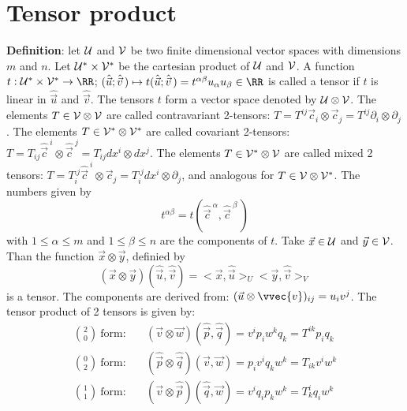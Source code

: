 \section{Tensor product}
{\bf Definition}: let $\cal U$ and $\cal V$ be two finite dimensional vector
spaces with dimensions $m$ and $n$. Let $\cal U^*\times V^*$ be the cartesian
product of $\cal U$ and $\cal V$. A function $t:{\cal U^*\times V^*}\rightarrow\RR$;
$(\hat{\vec{u}};\hat{\vec{v}}\,)\mapsto t(\hat{\vec{u}};\hat{\vec{v}}\,)=t^{\alpha\beta}u_\alpha u_\beta\in\RR$
is called a tensor if $t$ is linear in $\hat{\vec{u}}$ and $\hat{\vec{v}}$.
The tensors $t$ form a vector space denoted by $\cal U\otimes V$.
The elements $T\in\cal V\otimes V$ are called contravariant 2-tensors:
$T=T^{ij}\vec{c}_i\otimes\vec{c}_j=T^{ij}\partial_i\otimes\partial_j$. The
elements $T\in\cal V^*\otimes V^*$ are called covariant 2-tensors:
$T=T_{ij}\hat{\vec{c}}^{~i}\otimes\hat{\vec{c}}^{~j}=T_{ij}dx^i\otimes dx^j$.
The elements $T\in\cal V^*\otimes V$ are called mixed 2 tensors:
$T=T_i^{.j}\hat{\vec{c}}^{~i}\otimes\vec{c}_j=T_i^{.j}dx^i\otimes\partial_j$,
and analogous for $T\in\cal V\otimes V^*$.
\npar
The numbers given by
\[
t^{\alpha\beta}=t(\hat{\vec{c}}^{~\alpha},\hat{\vec{c}}^{~\beta}\,)
\]
with $1\leq\alpha\leq m$ and $1\leq\beta\leq n$ are the components of $t$.
\npar
Take $\vec{x}\in\cal U$ and $\vec{y}\in\cal V$. Than the function
$\vec{x}\otimes\vec{y}$, definied by
\[
(\vec{x}\otimes\vec{y})(\hat{\vec{u}},\hat{\vec{v}})=<\vec{x},\hat{\vec{u}}>_U<\vec{y},\hat{\vec{v}}>_V
\]
is a tensor. The components are derived from: $(\vec{u}\otimes\vvec{v})_{ij}=u_iv^j$.
The tensor product of 2 tensors is given by:
\begin{eqnarray*}
{2\choose0}~\mbox{form:}~&&(\vec{v}\otimes\vec{w})(\hat{\vec{p}},\hat{\vec{q}})=v^ip_iw^kq_k=T^{ik}p_iq_k\\
{0\choose2}~\mbox{form:}~&&(\hat{\vec{p}}\otimes\hat{\vec{q}})(\vec{v},\vec{w})=p_iv^iq_kw^k=T_{ik}v^iw^k\\
{1\choose1}~\mbox{form:}~&&(\vec{v}\otimes\hat{\vec{p}})(\hat{\vec{q}},\vec{w})=v^iq_ip_kw^k=T_k^iq_iw^k
\end{eqnarray*}


